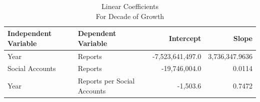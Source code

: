 \begin{table}[!t]
\caption*{
{\large Linear Coefficients} \\
{\small For Decade of Growth}
} 

\fontsize{12.0pt}{14.4pt}\selectfont

\begin{tabular*}{\linewidth}{@{\extracolsep{\fill}}llrr}
\toprule
Independent Variable & Dependent Variable & Intercept & Slope \\ 
\midrule\addlinespace[2.5pt]
Year & Reports & -7,523,641,497.0 & 3,736,347.9636 \\
Social Accounts & Reports & -19,746,004.0 & 0.0114 \\
Year & Reports per Social Accounts & -1,503.6 & 0.7472 \\
\bottomrule
\end{tabular*}

\end{table}
